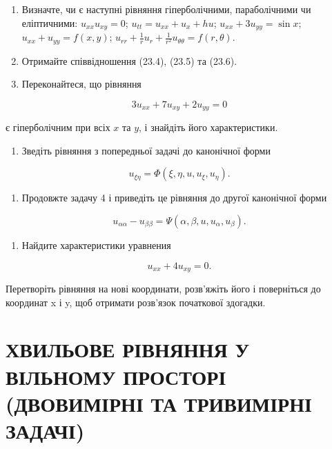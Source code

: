 \documentclass[
  ukrainian,
]{article}
\providecommand{\tightlist}{%
  \setlength{\itemsep}{0pt}\setlength{\parskip}{0pt}}
\begin{document}
\begin{enumerate}
\def\labelenumi{\arabic{enumi}.}
\item
  Визначте, чи є наступні рівняння гіперболічними, параболічними чи
  еліптичними: \(u_{xx}u_{xy}=0\); \(u_{tt}=u_{xx}+u_x+hu\);
  \(u_{xx}+3u_{yy}=\sin x\); \(u_{xx}+u_{yy}=f(x,y)\);
  \(u_{rr}+\frac{1}{r}u_r+\frac{1}{r^2}u_{\theta\theta}=f(r,\theta)\).
\item
  Отримайте співвідношення (23.4), (23.5) та (23.6).
\item
  Переконайтеся, що рівняння
\end{enumerate}

\[3u_{xx} + 7u_{xy} + 2u_{yy} = 0\]

є гіперболічним при всіх \(x\) та \(y\), і знайдіть його характеристики.

\begin{enumerate}
\def\labelenumi{\arabic{enumi}.}
\setcounter{enumi}{3}
\tightlist
\item
  Зведіть рівняння з попередньої задачі до канонічної форми
\end{enumerate}

\[u_{\xi\eta} = \Phi(\xi, \eta, u, u_{\xi}, u_{\eta}).\]

\begin{enumerate}
\def\labelenumi{\arabic{enumi}.}
\setcounter{enumi}{4}
\tightlist
\item
  Продовжте задачу 4 і приведіть це рівняння до другої канонічної форми
\end{enumerate}

\[u_{\alpha\alpha} - u_{\beta\beta} = \Psi(\alpha, \beta, u, u_{\alpha}, u_{\beta}).\]

\begin{enumerate}
\def\labelenumi{\arabic{enumi}.}
\setcounter{enumi}{5}
\tightlist
\item
  Найдите характеристики уравнения
\end{enumerate}

\[u_{xx} + 4u_{xy} = 0.\]

Перетворіть рівняння на нові координати, розв'яжіть його і поверніться
до координат x і y, щоб отримати розв'язок початкової здогадки.

\section{ХВИЛЬОВЕ РІВНЯННЯ У ВІЛЬНОМУ ПРОСТОРІ (ДВОВИМІРНІ ТА ТРИВИМІРНІ
ЗАДАЧІ)}\label{ux445ux432ux438ux43bux44cux43eux432ux435-ux440ux456ux432ux43dux44fux43dux43dux44f-ux443-ux432ux456ux43bux44cux43dux43eux43cux443-ux43fux440ux43eux441ux442ux43eux440ux456-ux434ux432ux43eux432ux438ux43cux456ux440ux43dux456-ux442ux430-ux442ux440ux438ux432ux438ux43cux456ux440ux43dux456-ux437ux430ux434ux430ux447ux456}
\end{document}
